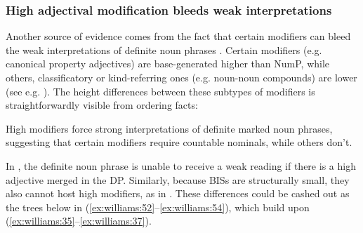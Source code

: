 \documentclass[output=paper,
modfonts
]{langscibook}
\begin{document}
\subsubsection{High adjectival modification bleeds weak interpretations}

Another source of  evidence comes from the fact that certain modifiers can bleed the weak interpretations of definite noun phrases \citep{Aguilar-Guevara2014}. Certain modifiers (e.g. canonical property adjectives) are base-generated higher \citep{Cinque2010} than NumP, while others, classificatory or kind-referring ones (e.g. noun-noun compounds) are lower (see e.g. \citealt{Laenzlinger2005}). The height differences between these subtypes of modifiers is straightforwardly visible from ordering facts:

\begin{exe}
\end{exe}

High modifiers force strong interpretations of definite marked noun phrases, suggesting that certain modifiers require countable nominals, while others don't. 
\begin{exe}
\end{exe}

In , the definite noun phrase is unable to receive a weak reading if there is a high adjective merged in the DP. Similarly, because BISs are structurally small, they also cannot host high modifiers, as in . These differences could be cashed out as the trees below in (\ref{ex:williams:52}--\ref{ex:williams:54}), which build upon (\ref{ex:williams:35}--\ref{ex:williams:37}).
\end{document}
